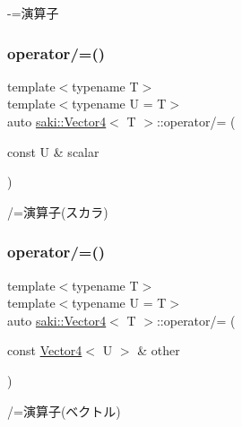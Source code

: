 -\/=演算子 

\mbox{\label{classsaki_1_1_vector4_ad02ea8316a175e5954c51504e021db34}} 
\subsubsection{\texorpdfstring{operator/=()}{operator/=()}\hspace{0.1cm}{\footnotesize\ttfamily [1/2]}}
{\footnotesize\ttfamily template$<$typename T$>$ \\
template$<$typename U  = T$>$ \\
auto \mbox{\hyperlink{classsaki_1_1_vector4}{saki\+::\+Vector4}}$<$ T $>$\+::operator/= (\begin{DoxyParamCaption}\item[{const U \&}]{scalar }\end{DoxyParamCaption})\hspace{0.3cm}{\ttfamily [inline]}}



/=演算子(スカラ) 

\mbox{\label{classsaki_1_1_vector4_a5c4714a49c12318eae4e19ee6280417f}} 
\subsubsection{\texorpdfstring{operator/=()}{operator/=()}\hspace{0.1cm}{\footnotesize\ttfamily [2/2]}}
{\footnotesize\ttfamily template$<$typename T$>$ \\
template$<$typename U  = T$>$ \\
auto \mbox{\hyperlink{classsaki_1_1_vector4}{saki\+::\+Vector4}}$<$ T $>$\+::operator/= (\begin{DoxyParamCaption}\item[{const \mbox{\hyperlink{classsaki_1_1_vector4}{Vector4}}$<$ U $>$ \&}]{other }\end{DoxyParamCaption})\hspace{0.3cm}{\ttfamily [inline]}}



/=演算子(ベクトル) 

